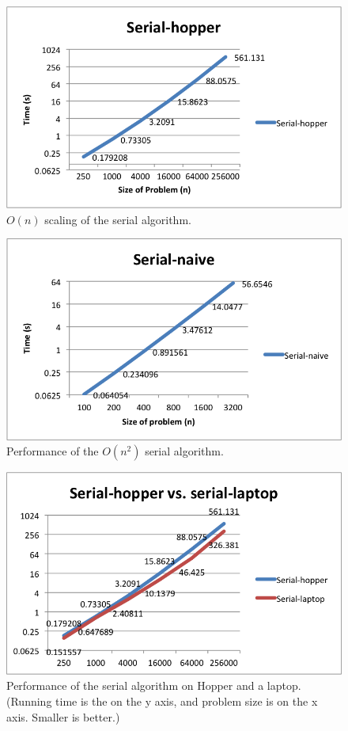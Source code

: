 \documentclass{article}
\begin{document}
\begin{figure}
  \includegraphics[width=\textwidth]{plots/Serial-Hopper.png}
  \caption{$O(n)$ scaling of the serial algorithm.}
  \label{fig:serial-on}
\end{figure}

\begin{figure}
  \includegraphics[width=\textwidth]{plots/Serial-Naive.png}
  \caption{Performance of the $O(n^2)$ serial algorithm.}
  \label{fig:serial-naive}
\end{figure}

\begin{figure}
  \includegraphics[width=\textwidth]{plots/Serial-laptop-vs-hopper.png}
  \caption{Performance of the serial algorithm on Hopper and a laptop.  (Running time is the on the y axis, and problem size is on the x axis.  Smaller is better.)}
  \label{fig:serial-laptop}
\end{figure}
\end{document}
